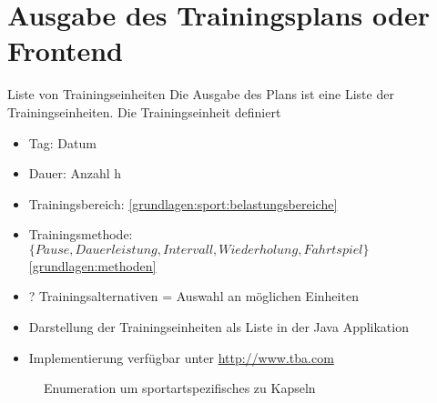 \section{Ausgabe des Trainingsplans oder Frontend}
Liste von Trainingseinheiten
\label{sec:modellierung:output}
Die Ausgabe des Plans ist eine Liste der Trainingseinheiten. Die Trainingseinheit definiert 
\begin{itemize}
    \item Tag: Datum
    \item Dauer: Anzahl h
    \item Trainingsbereich: \ref{grundlagen:sport:belastungsbereiche}
    \item Trainingsmethode: $\{Pause, Dauerleistung, Intervall, Wiederholung, Fahrtspiel\}$ \ref{grundlagen:methoden}
    \item ? Trainingsalternativen = Auswahl an möglichen Einheiten
\end{itemize}

\begin{itemize}
    \item Darstellung der Trainingseinheiten als Liste in der Java Applikation
    \item Implementierung verfügbar unter \url{http://www.tba.com}
\end{itemize}

\begin{figure}[h]
    \caption{Enumeration um sportartspezifisches zu Kapseln}
    \label{fig:uml:solver}
\end{figure}

